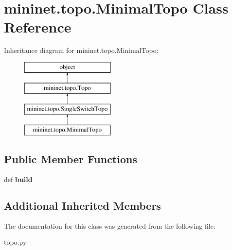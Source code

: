 \hypertarget{classmininet_1_1topo_1_1MinimalTopo}{\section{mininet.\-topo.\-Minimal\-Topo Class Reference}
\label{classmininet_1_1topo_1_1MinimalTopo}
}
Inheritance diagram for mininet.\-topo.\-Minimal\-Topo\-:\begin{figure}[H]
\begin{center}
\leavevmode
\includegraphics[height=4.000000cm]{classmininet_1_1topo_1_1MinimalTopo}
\end{center}
\end{figure}
\subsection*{Public Member Functions}
\begin{DoxyCompactItemize}
\item 
\hypertarget{classmininet_1_1topo_1_1MinimalTopo_ac7be07b16d7f38e2c1046ea9321c9885}{def {\bfseries build}}\label{classmininet_1_1topo_1_1MinimalTopo_ac7be07b16d7f38e2c1046ea9321c9885}

\end{DoxyCompactItemize}
\subsection*{Additional Inherited Members}


The documentation for this class was generated from the following file\-:\begin{DoxyCompactItemize}
\item 
topo.\-py\end{DoxyCompactItemize}
